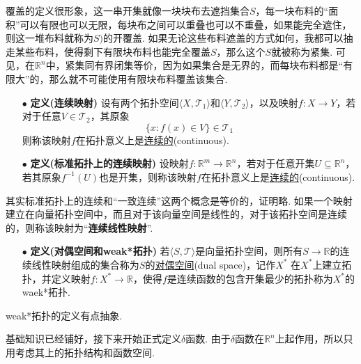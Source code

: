 \documentclass[main.tex]{subfiles}
\begin{document}
覆盖的定义很形象，这一串开集就像一块块布去遮挡集合\(S\)，每一块布料的“面积”可以有限也可以无限，每块布之间可以重叠也可以不重叠，如果能完全遮住，则这一堆布料就称为\(S)\)的开覆盖. 如果无论这些布料遮盖的方式如何，我都可以抽走某些布料，使得剩下有限块布料也能完全覆盖\(S\)，那么这个\(S\)就被称为紧集. 可见，在\(\mathbb{R}^n\)中，紧集同有界闭集等价，因为如果集合是无界的，而每块布料都是“有限大”的，那么就不可能使用有限块布料覆盖该集合.

\begin{itemize}
    \item [\(\bullet\)] \textbf{定义(连续映射)}
    \newline
    设有两个拓扑空间\(\langle X, \mathcal{T}_1 \rangle\)和\(\langle Y, \mathcal{T}_2 \rangle\)，以及映射\(f:X \to Y\)，若对于任意\(V \in \mathcal{T}_2\)，其原象
    \[\{x: f(x) \in V\} \in \mathcal{T}_1\]
    则称该映射\(f\)在拓扑意义上是\uline{连续的}(continuous).
    \item [\(\bullet\)] \textbf{定义(标准拓扑上的连续映射)}
    \newline
    设映射\(f:\mathbb{R}^m \to \mathbb{R}^n\)，若对于任意开集\(U \subseteq \mathbb{R}^n\)，若其原象\(f^{-1}(U)\)也是开集，则称该映射\(f\)在拓扑意义上是\uline{连续的}(continuous).
\end{itemize}

其实标准拓扑上的连续和“一致连续”这两个概念是等价的，证明略. 如果一个映射建立在向量拓扑空间中，而且对于该向量空间是线性的，对于该拓扑空间是连续的，则称该映射为“\textbf{连续线性映射}”. 

\begin{itemize}
    \item [\(\bullet\)] \textbf{定义(对偶空间和weak*拓扑)}
    \newline
    若\(\langle S ,\mathcal{T} \rangle\)是向量拓扑空间，则所有\(S \to \mathbb{R}\)的连续线性映射组成的集合称为\(S\)的\uline{对偶空间}(dual space)，记作\(X^*\)
    \newline
    在\(X^*\)上建立拓扑，并定义映射\(f:X^* \to \mathbb{R}\)，使得\(f\)是连续函数的包含开集最少的拓扑称为\(X^*\)的waek*拓扑.
\end{itemize}

weak*拓扑的定义有点抽象. 

\vspace{1cm}

基础知识已经铺好，接下来开始正式定义\(\delta\)函数. 由于\(\delta\)函数在\(\mathbb{R}^n\)上起作用，所以只用考虑其上的拓扑结构和函数空间.
\end{document}
